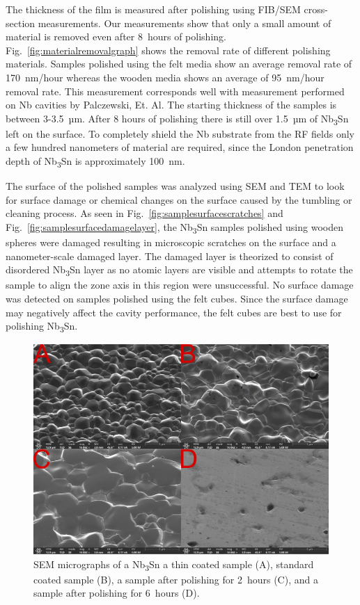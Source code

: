 \documentclass[reprint,amsmath,amssymb,aps]{revtex4-2}%
\begin{document}
The thickness of the film is measured after polishing using FIB/SEM cross-section measurements. Our measurements show that only a small amount of material is removed even after 8~hours of polishing. Fig.~\ref{fig:materialremovalgraph} shows the removal rate of different polishing materials. Samples polished using the felt media show an average removal rate of 170~nm/hour whereas the wooden media shows an average of 95~nm/hour removal rate. This measurement corresponds well with measurement performed on Nb cavities by Palczewski, Et. Al.\cite{palczewski2013exploration} The starting thickness of the samples is between 3-3.5~µm. After 8 hours of polishing there is still over 1.5~µm of Nb\textsubscript{3}Sn left on the surface. To completely shield the Nb substrate from the RF fields only a few hundred nanometers of material are required, since the London penetration depth of Nb\textsubscript{3}Sn is approximately 100~nm\cite{liarte2017theoretical}.

The surface of the polished samples was analyzed using SEM and TEM to look for surface damage or chemical changes on the surface caused by the tumbling or cleaning process. As seen in Fig.~\ref{fig:samplesurfacescratches} and Fig.~\ref{fig:samplesurfacedamagelayer}, the Nb\textsubscript{3}Sn samples polished using wooden spheres were damaged resulting in microscopic scratches on the surface and a nanometer-scale damaged layer. The damaged layer is theorized to consist of disordered Nb\textsubscript{3}Sn layer as no atomic layers are visible and attempts to rotate the sample to align the zone axis in this region were unsuccessful. No surface damage was detected on samples polished using the felt cubes. Since the surface damage may negatively affect the cavity performance, the felt cubes are best to use for polishing Nb\textsubscript{3}Sn.
%




%


\begin{figure}[t]%
\centering%
\includegraphics[width=0.8\columnwidth]{../doc/figs/SEM_Images.png}%
\caption{SEM micrographs of a Nb\textsubscript{3}Sn a thin coated sample (A), standard coated sample (B), a sample after polishing for 2~hours (C), and a sample after polishing for 6~hours (D).}%
\label{fig:semimages}%
\end{figure}
\end{document}
